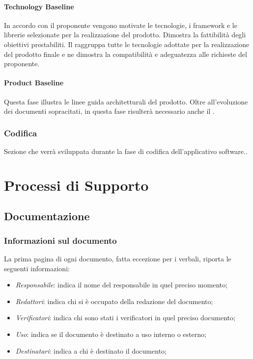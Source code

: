 \paragraph{Technology Baseline}
In accordo con il proponente vengono motivate le tecnologie, i framework\glo{} e le librerie selezionate per la realizzazione del prodotto. Dimostra la fattibilità degli obiettivi prestabiliti.
Il \docNamePoC{} raggruppa tutte le tecnologie adottate per la realizzazione del prodotto finale e ne dimostra la compatibilità e adeguatezza alle richieste del proponente.

\paragraph{Product Baseline}
Questa fase illustra le linee guida architetturali del prodotto. Oltre all’evoluzione dei documenti sopracitati, in questa fase risulterà necessario anche il \docNameMU{}.

\subsubsection{Codifica}
Sezione che verrà sviluppata durante la fase di codifica dell'applicativo software..

\pagebreak

\section{Processi di Supporto}
\subsection{Documentazione}
\subsubsection{Informazioni sul documento}
La prima pagina di ogni documento, fatta eccezione per i verbali, riporta le seguenti informazioni:
\begin{itemize}
\item \textit{Responsabile}: indica il nome del responsabile in quel preciso momento;
\item \textit{Redattori}: indica chi si è occupato della redazione del documento;
\item \textit{Verificatori}: indica chi sono stati i verificatori in quel preciso documento;
\item \textit{Uso}: indica se il documento è destinato a uso interno o esterno;
\item \textit{Destinatari}: indica a chi è destinato il documento;
\end{itemize}

